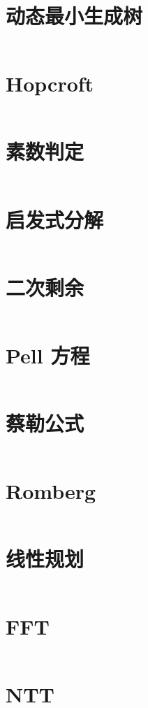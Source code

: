 \documentclass[titlepage,landscape,a4paper,10pt]{article}
\begin{document}
\begin{multicols}{2}
\begin{spacing}{0.8}
\section{动态最小生成树}
\inputminted{cpp}{src/动态最小生成树.cpp}

\section{Hopcroft}
\inputminted{cpp}{src/Hopcroft.cpp}

\section{素数判定}
\inputminted{cpp}{src/素数判定.cpp}

\section{启发式分解}
\inputminted{cpp}{src/启发式分解.cpp}

\section{二次剩余}
\inputminted{cpp}{src/二次剩余.cpp}

\section{Pell 方程}
\inputminted{cpp}{src/Pell方程.cpp}

\section{蔡勒公式}
\inputminted{cpp}{src/蔡勒公式.cpp}

\section{Romberg}
\inputminted{cpp}{src/Romberg.cpp}

\section{线性规划}
\inputminted{cpp}{src/线性规划.cpp}

\section{FFT}
\inputminted{cpp}{src/fft.cpp}

\section{NTT}
\inputminted{cpp}{src/ntt.cpp}


\end{spacing}
\end{multicols}
\end{document}
